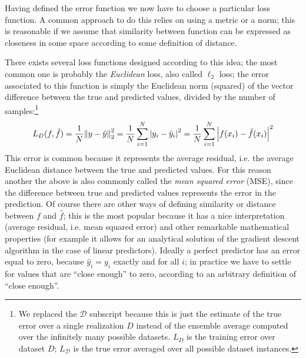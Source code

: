 Having defined the error function we now have to choose a particular loss function.
A common approach to do this relies on using a metric or a norm; this is reasonable if we assume that similarity between function can be expressed as closeness in some space according to some definition of distance.

There exists several loss functions designed according to this idea; the most common one is probably the \emph{Euclidean} loss, also called $\ell_2$ loss; the error associated to this function is simply the Euclidean norm (squared) of the vector difference between the true and predicted values, divided by the number of samples:\footnote{We replaced the $\mathcal{D}$ subscript because this is just the estimate of the true error over a single realization $D$ instead of the ensemble average computed over the infinitely many possible datasets. $L_D$ is the training error over dataset $D$; $L_\mathcal{D}$ is the true error averaged over all possible dataset instances.}
\begin{equation*}
    L_D(f, \hat{f}) = \frac{1}{N} \norm{y - \hat{y}}_2^2 = \frac{1}{N}\sum_{i=1}^N \abs{y_i - \hat{y}_i}^2 = \frac{1}{N}\sum_{i=1}^N \abs{f(x_i) - \hat{f}(x_i)}^2
\end{equation*}
This error is common because it represents the average residual, i.e. the average Euclidean distance between the true and predicted values. For this reason another the above is also commonly called the \emph{mean squared error} (MSE), since the difference between true and predicted values represents the error in the prediction.
Of course there are other ways of defining similarity or distance between $f$ and $\hat{f}$; this is the most popular because it has a nice interpretation (average residual, i.e. mean squared error) and other remarkable mathematical properties (for example it allows for an analytical solution of the gradient descent algorithm in the case of linear predictors).
Ideally a perfect predictor has an error equal to zero, because $\hat{y}_i = y_i$ exactly and for all $i$; in practice we have to settle for values that are ``close enough'' to zero, according to an arbitrary definition of ``close enough''.

